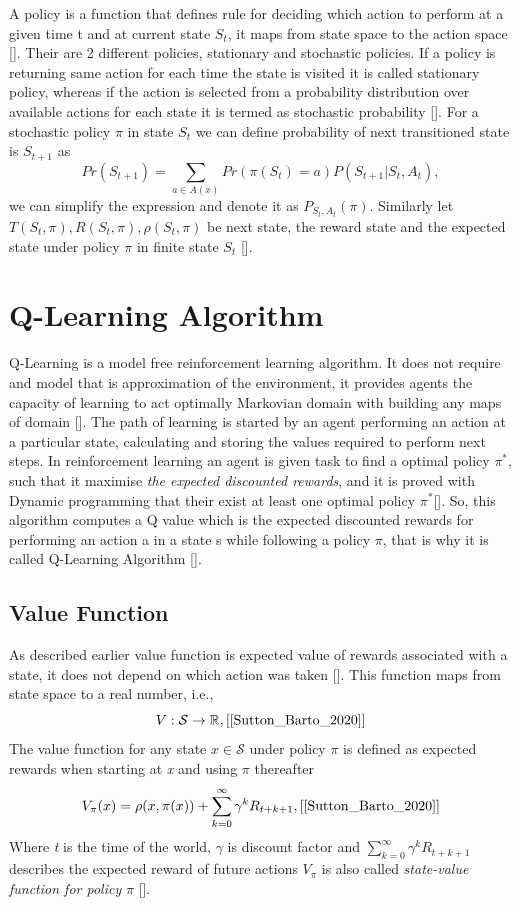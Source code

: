 \documentclass[12pt]{article}
\begin{document}
A policy is a function that defines rule for deciding which action to perform at a given time t and at current state $S_t$, it maps from state space to the action space [\cite{1989}]. Their are 2 different policies, stationary and stochastic policies. If a policy is returning same action for each time the state is visited it is called stationary policy, whereas if the action is selected from a probability distribution over available actions for each state it is termed as stochastic probability [\cite{1989}]. For a stochastic policy $\pi$ in state $S_t$ we can define probability of next transitioned state is $S_{t+1}$ as $$Pr(S_{t+1}) = \sum_{a \in A(x)}Pr(\pi(S_t) = a)P(S_{t+1}|S_t, A_t),$$ we can simplify the expression and denote it as $P_{S_t,A_t}(\pi)$. Similarly let $T(S_t, \pi), R(S_t, \pi), \rho(S_t, \pi)$ be next state, the reward state and the expected state under policy $\pi$ in finite state $S_t$ [\cite{1989}].

\section{Q-Learning Algorithm}

Q-Learning is a model free reinforcement learning algorithm. It does not require and model that is approximation of the environment, it provides agents the capacity of learning to act optimally Markovian domain with building any maps of domain [\cite{1992}]. The path of learning is started by an agent performing an action at a particular state, calculating and storing the values required to perform next steps. In reinforcement learning an agent is given task to find a optimal policy $\pi^*$, such that it maximise \textit{the expected discounted rewards}, and it is proved with Dynamic programming that their exist at least one optimal policy $\pi^*$[\cite{1992}]. So, this algorithm computes a Q value which is the expected discounted rewards for performing an action a in a state s while following a policy $\pi$, that is why it is called Q-Learning Algorithm [\cite{1992}]. 

\subsection{Value Function}

As described earlier value function is expected value of rewards associated with a state, it does not depend on which action was taken [\cite{Sutton_Barto_2020}]. This function maps from state space to a real number, i.e., $$V:\mathcal{S} \rightarrow \mathbb{R}, \text{[\cite{Sutton_Barto_2020}]}$$ The value function for any state $x \in \mathcal{S}$ under policy $\pi$ is defined as expected rewards when starting at \textit{x} and using $\pi$ thereafter $$V_{\pi}(x) = \rho(x, \pi(x)) + \sum_{k=0}^{\infty}\gamma^kR_{t+k+1}, \text{[\cite{Sutton_Barto_2020}]}$$ Where \textit{t} is the time of the world, $\gamma$ is discount factor and $\sum_{k=0}^{\infty}\gamma^kR_{t+k+1}$ describes the expected reward of future actions $V_{\pi}$ is also called \textit{state-value function for policy } $\pi$ [\cite{Sutton_Barto_2020}].
\end{document}
